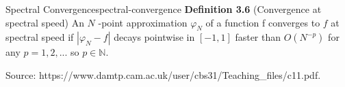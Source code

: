 \begin{definition}{Spectral Convergence}{spectral-convergence}
  \textbf{Definition 3.6} (Convergence at spectral speed) An \(N\) -point
  approximation \(\varphi_N\) of a function f converges to \(f\) at
  spectral speed if \(|\varphi_N -f|\) decays pointwise in \([-1, 1]\)
  faster than \(O(N^{-p})\) for any \(p = 1, 2, . . .\) so
  \(p \in \mathbb{N}\).

  Source: https://www.damtp.cam.ac.uk/user/cbs31/Teaching\_files/c11.pdf.
\end{definition}
